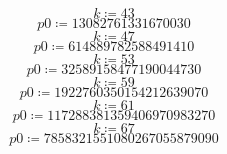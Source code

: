\documentclass{article}
\begin{document}
\begin{dmath*}
k \coloneqq 43
\end{dmath*}
\vspace{-\bigskipamount}
\begin{dmath*}
\mathit{p0} \coloneqq 13082761331670030
\end{dmath*}
\vspace{-\bigskipamount}
\begin{dmath*}
k \coloneqq 47
\end{dmath*}
\vspace{-\bigskipamount}
\begin{dmath*}
\mathit{p0} \coloneqq 614889782588491410
\end{dmath*}
\vspace{-\bigskipamount}
\begin{dmath*}
k \coloneqq 53
\end{dmath*}
\vspace{-\bigskipamount}
\begin{dmath*}
\mathit{p0} \coloneqq 32589158477190044730
\end{dmath*}
\vspace{-\bigskipamount}
\begin{dmath*}
k \coloneqq 59
\end{dmath*}
\vspace{-\bigskipamount}
\begin{dmath*}
\mathit{p0} \coloneqq 1922760350154212639070
\end{dmath*}
\vspace{-\bigskipamount}
\begin{dmath*}
k \coloneqq 61
\end{dmath*}
\vspace{-\bigskipamount}
\begin{dmath*}
\mathit{p0} \coloneqq 117288381359406970983270
\end{dmath*}
\vspace{-\bigskipamount}
\begin{dmath*}
k \coloneqq 67
\end{dmath*}
\vspace{-\bigskipamount}
\begin{dmath*}
\mathit{p0} \coloneqq 7858321551080267055879090
\end{dmath*}
\vspace{-\bigskipamount}
\end{document}
